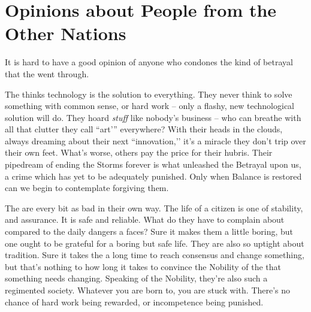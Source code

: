 \documentclass[blue]{GL2020}
\begin{document}
\section*{Opinions about People from the Other Nations}
It is hard to have a good opinion of anyone who condones the kind of betrayal that the \pShip{} went through. 

The \pTech{} thinks technology is the solution to everything. They never think to solve something with common sense, or hard work – only a flashy, new technological solution will do. They hoard \emph{stuff} like nobody's business -- who can breathe with all that clutter they call ``art'” everywhere? With their heads in the clouds, always dreaming about their next ``innovation,'’ it's a miracle they don't trip over their own feet. What's worse, others pay the price for their hubris. Their pipedream of ending the Storms forever is what unleashed the Betrayal upon us, a crime which has yet to be adequately punished. Only when Balance is restored can we begin to contemplate forgiving them. 

The \pFarm{} are every bit as bad in their own way. The life of a \pFarm{} citizen is one of stability, and assurance. It is safe and reliable. What do they have to complain about compared to the daily dangers a \pShippie{} faces? Sure it makes them a little boring, but one ought to be grateful for a boring but safe life. They are also so uptight about tradition. Sure it takes the \pShip{} a long time to reach consensus and change something, but that's nothing to how long it takes to convince the Nobility of the \pFarm{} that something needs changing. Speaking of the Nobility, they're also such a regimented society. Whatever you are born to, you are stuck with. There's no chance of hard work being rewarded, or incompetence being punished.
\end{document}
